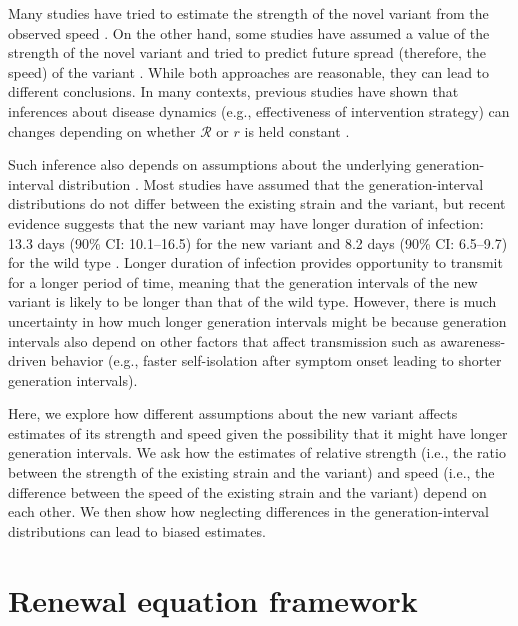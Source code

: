 \documentclass[12pt]{article}
\newcommand{\RR}{\ensuremath{{\mathcal R}}\xspace}
\begin{document}
Many studies have tried to estimate the strength of the novel variant from the observed speed \citep{davies2021estimated, leung2021early, volz2021transmission,zhao2021}.
On the other hand, some studies have assumed a value of the strength of the novel variant and tried to predict future spread (therefore, the speed) of the variant \citep{davies2021estimated}.
While both approaches are reasonable, they can lead to different conclusions.
In many contexts, previous studies have shown that inferences about disease dynamics (e.g., effectiveness of intervention strategy) can changes depending on whether $\RR$ or $r$ is held constant \citep{dushoff2020speed}.

Such inference also depends on assumptions about the underlying generation-interval distribution \citep{roberts2007model,svensson2007note,wallinga2007generation}.
Most studies have assumed that the generation-interval distributions do not differ between the existing strain and the variant, but recent evidence suggests that the new variant may have longer duration of infection: 13.3 days (90\% CI: 10.1--16.5) for the new variant and 8.2 days (90\% CI: 6.5--9.7) for the wild type \citep{kissler2021densely}.
Longer duration of infection provides opportunity to transmit for a longer period of time, meaning that the generation intervals of the new variant is likely to be longer than that of the wild type.
However, there is much uncertainty in how much longer generation intervals might be because generation intervals also depend on other factors that affect transmission such as awareness-driven behavior (e.g., faster self-isolation after symptom onset leading to shorter generation intervals).

Here, we explore how different assumptions about the new variant affects estimates of its strength and speed given the possibility that it might have longer generation intervals.
We ask how the estimates of relative strength (i.e., the ratio between the strength of the existing strain and the variant) and speed (i.e., the difference between the speed of the existing strain and the variant) depend on each other.
We then show how neglecting differences in the generation-interval distributions can lead to biased estimates.

\section{Renewal equation framework}
\end{document}
